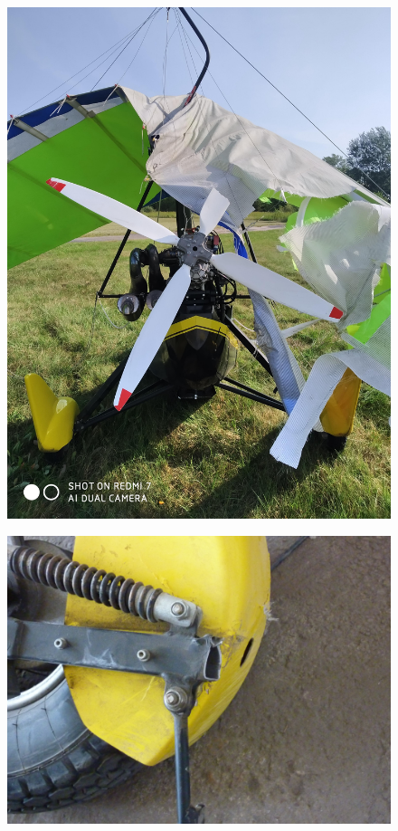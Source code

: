 \documentclass[a4paper,10pt]{article}
\begin{document}
\begin{figure}[ht!]
\centering
\includegraphics[width=13cm]{kepek/CR2}
\end{figure}
\begin{figure}[ht!]
\centering
\includegraphics[width=13cm]{kepek/KJ1}
\end{figure}
\end{document}
